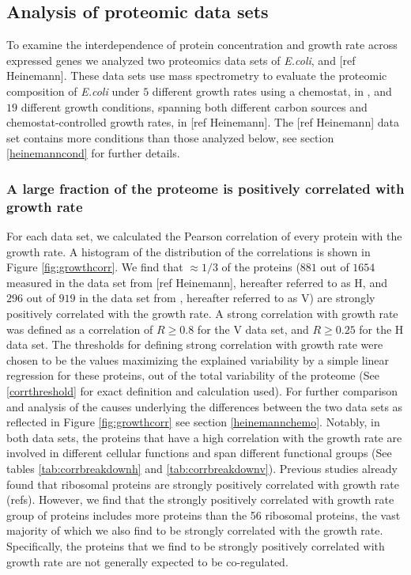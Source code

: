 \documentclass[notitlepage]{article}
\begin{document}
\subsection{Analysis of proteomic data sets}
To examine the interdependence of protein concentration and growth rate across expressed genes we analyzed two proteomics data sets of \emph{E.coli}, \cite{Valgepea2013} and [ref Heinemann].
These data sets use mass spectrometry to evaluate the proteomic composition of \emph{E.coli} under $5$ different growth rates using a chemostat, in \cite{Valgepea2013}, and $19$ different growth conditions, spanning both different carbon sources and chemostat-controlled growth rates, in [ref Heinemann].
The [ref Heinemann] data set contains more conditions than those analyzed below, see section \ref{heinemanncond} for further details.
\subsubsection{A large fraction of the proteome is positively correlated with growth rate}
For each data set, we calculated the Pearson correlation of every protein with the growth rate.
A histogram of the distribution of the correlations is shown in Figure \ref{fig:growthcorr}.
We find that $\approx 1/3$ of the proteins ($881$ out of $1654$ measured in the data set from [ref Heinemann], hereafter referred to as H, and $296$ out of $919$ in the data set from \cite{Valgepea2013}, hereafter referred to as V) are strongly positively correlated with the growth rate.
A strong correlation with growth rate was defined as a correlation of $R\geq 0.8$ for the V data set, and $R\geq 0.25$ for the H data set.
The thresholds for defining strong correlation with growth rate were chosen to be the values maximizing the explained variability by a simple linear regression for these proteins, out of the total variability of the proteome (See \ref{corrthreshold} for exact definition and calculation used).
For further comparison and analysis of the causes underlying the differences between the two data sets as reflected in Figure \ref{fig:growthcorr} see section \ref{heinemannchemo}.
Notably, in both data sets, the proteins that have a high correlation with the growth rate are involved in different cellular functions and span different functional groups (See tables \ref{tab:corrbreakdownh} and \ref{tab:corrbreakdownv}).
Previous studies already found that ribosomal proteins are strongly positively correlated with growth rate (refs).
However, we find that the strongly positively correlated with growth rate group of proteins includes more proteins than the 56 ribosomal proteins, the vast majority of which we also find to be strongly correlated with the growth rate.
Specifically, the proteins that we find to be strongly positively correlated with growth rate are not generally expected to be co-regulated.
\end{document}

